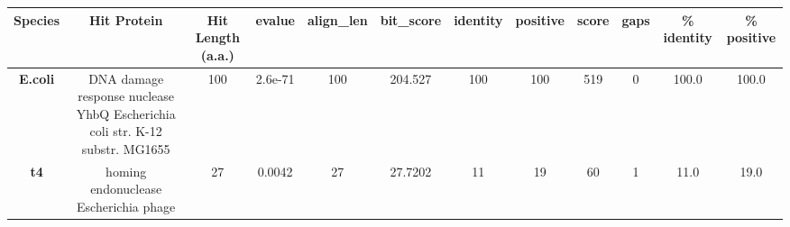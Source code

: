 \begin{tabular}{|c|c|c|c|c|c|c|c|c|c|c|c|} \hline
\textbf{Species} & \textbf{Hit Protein} & \textbf{Hit Length (a.a.)} & \textbf{evalue} & \textbf{align\_len} & \textbf{bit\_score} & \textbf{identity} & \textbf{positive} & \textbf{score} & \textbf{gaps} & \textbf{\% identity} & \textbf{\% positive} \\ \hline
\textbf{E.coli} & DNA damage response nuclease YhbQ Escherichia coli str. K-12 substr. MG1655 & 100 & 2.6e-71 & 100 & 204.527 & 100 & 100 & 519 & 0 & 100.0 & 100.0\\
\textbf{t4} & homing endonuclease Escherichia phage  & 27 & 0.0042 & 27 & 27.7202 & 11 & 19 & 60 & 1 & 11.0 & 19.0\\
\hline \end{tabular}
